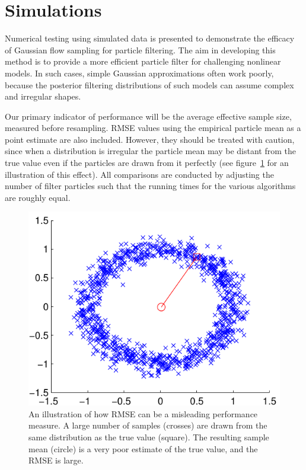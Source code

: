 \documentclass{article}
\begin{document}
\section{Simulations}

Numerical testing using simulated data is presented to demonstrate the efficacy of Gaussian flow sampling for particle filtering. The aim in developing this method is to provide a more efficient particle filter for challenging nonlinear models. In such cases, simple Gaussian approximations often work poorly, because the posterior filtering distributions of such models can assume complex and irregular shapes.

Our primary indicator of performance will be the average effective sample size, measured before resampling. RMSE values using the empirical particle mean as a point estimate are also included. However, they should be treated with caution, since when a distribution is irregular the particle mean may be distant from the true value even if the particles are drawn from it perfectly (see figure~\ref{fig:rmse_fail} for an illustration of this effect). All comparisons are conducted by adjusting the number of filter particles such that the running times for the various algorithms are roughly equal.
%
\begin{figure}
\centering
\includegraphics[width=0.7\columnwidth]{rmse_fail.pdf}
\caption{An illustration of how RMSE can be a misleading performance measure. A large number of samples (crosses) are drawn from the same distribution as the true value (square). The resulting sample mean (circle) is a very poor estimate of the true value, and the RMSE is large.}
\label{fig:rmse_fail}
\end{figure}
\end{document}
